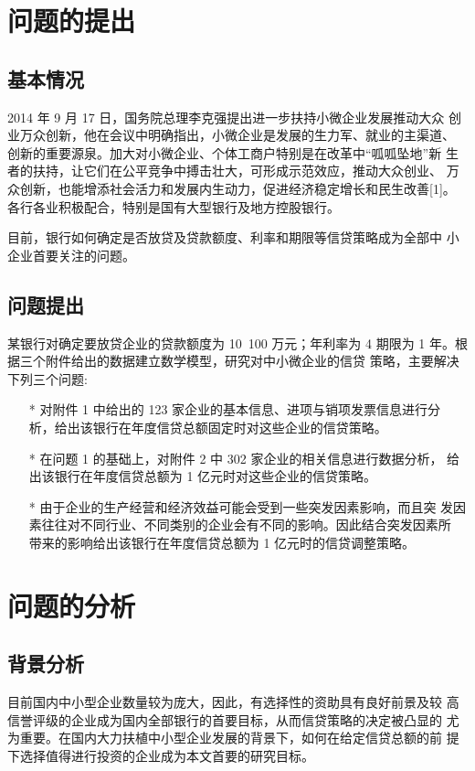 \documentclass{article}
\begin{document}
\section{问题的提出}
\subsection{基本情况}
2014 年 9 月 17 日，国务院总理李克强提出进一步扶持小微企业发展推动大众
创业万众创新，他在会议中明确指出，小微企业是发展的生力军、就业的主渠道、
创新的重要源泉。加大对小微企业、个体工商户特别是在改革中“呱呱坠地”新
生者的扶持，让它们在公平竞争中搏击壮大，可形成示范效应，推动大众创业、
万众创新，也能增添社会活力和发展内生动力，促进经济稳定增长和民生改善[1]。
各行各业积极配合，特别是国有大型银行及地方控股银行。\par
目前，银行如何确定是否放贷及贷款额度、利率和期限等信贷策略成为全部中
小企业首要关注的问题。
\subsection{问题提出}
某银行对确定要放贷企业的贷款额度为 10~100 万元；年利率为 4%
期限为 1 年。根据三个附件给出的数据建立数学模型，研究对中小微企业的信贷
策略，主要解决下列三个问题:
\begin{itemize}
    \item [*] 对附件 1 中给出的 123 家企业的基本信息、进项与销项发票信息进行分
    析，给出该银行在年度信贷总额固定时对这些企业的信贷策略。
    \item [*] 在问题 1 的基础上，对附件 2 中 302 家企业的相关信息进行数据分析，
    给出该银行在年度信贷总额为 1 亿元时对这些企业的信贷策略。
    \item [*] 由于企业的生产经营和经济效益可能会受到一些突发因素影响，而且突
    发因素往往对不同行业、不同类别的企业会有不同的影响。因此结合突发因素所
    带来的影响给出该银行在年度信贷总额为 1 亿元时的信贷调整策略。
\end{itemize}
\section{问题的分析}
\subsection{背景分析}
    目前国内中小型企业数量较为庞大，因此，有选择性的资助具有良好前景及较
高信誉评级的企业成为国内全部银行的首要目标，从而信贷策略的决定被凸显的
尤为重要。在国内大力扶植中小型企业发展的背景下，如何在给定信贷总额的前
提下选择值得进行投资的企业成为本文首要的研究目标。
\end{document}
